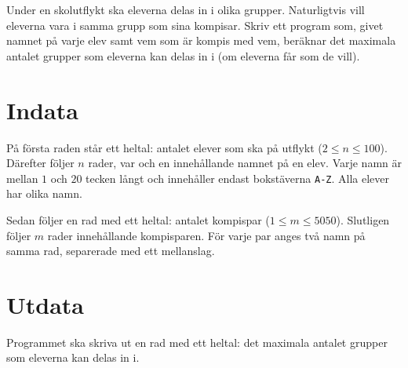 Under en skolutflykt ska eleverna delas in i olika grupper.
Naturligtvis vill eleverna vara i samma grupp som sina kompisar.
Skriv ett program som, givet namnet på varje elev samt vem som är kompis med vem, beräknar det maximala antalet grupper som eleverna kan delas in i (om eleverna får som de vill).

\section*{Indata}
På första raden står ett heltal: antalet elever som ska på utflykt ($2 \le n \le 100$).
Därefter följer $n$ rader, var och en innehållande namnet på en elev.
Varje namn är mellan $1$ och $20$ tecken långt och innehåller endast bokstäverna \texttt{A-Z}.
Alla elever har olika namn.

Sedan följer en rad med ett heltal: antalet kompispar ($1 \le m \le 5050$).
Slutligen följer $m$ rader innehållande kompisparen.
För varje par anges två namn på samma rad, separerade med ett mellanslag.

\section*{Utdata}
Programmet ska skriva ut en rad med ett heltal: det maximala antalet grupper som eleverna kan delas in i.
